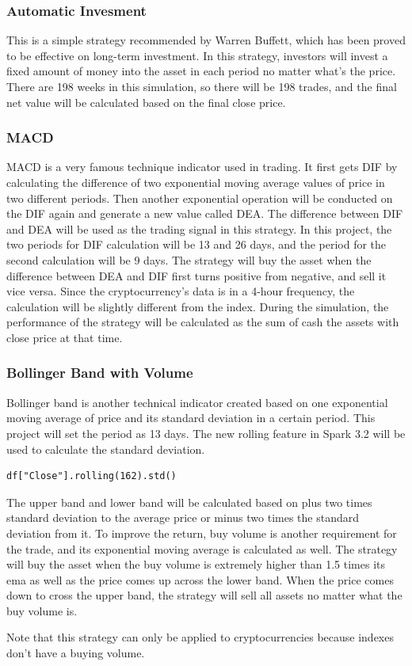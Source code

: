 \documentclass[a4paper]{article}
\begin{document}
\subsubsection{Automatic Invesment}
This is a simple strategy recommended by Warren Buffett, which has been proved to be effective on long-term investment. In this strategy, investors will invest a fixed amount of money into the asset in each period no matter what's the price. There are 198 weeks in this simulation, so there will be 198 trades, and the final net value will be calculated based on the final close price.
\subsubsection{MACD}
MACD is a very famous technique indicator used in trading. It first gets DIF by calculating the difference of two exponential moving average values of price in two different periods.  Then another exponential operation will be conducted on the DIF again and generate a new value called DEA. The difference between DIF and DEA will be used as the trading signal in this strategy. In this project, the two periods for DIF calculation will be 13 and 26 days, and the period for the second calculation will be 9 days. The strategy will buy the asset when the difference between DEA and DIF first turns positive from negative, and sell it vice versa. Since the cryptocurrency's data is in a 4-hour frequency, the calculation will be slightly different from the index. During the simulation, the performance of the strategy will be calculated as the sum of cash the assets with close price at that time.
\subsubsection{Bollinger Band with Volume}
Bollinger band is another technical indicator created based on one exponential moving average of price and its standard deviation in a certain period. This project will set the period as 13 days. The new rolling feature in Spark 3.2 will be used to calculate the standard deviation.
\begin{verbatim}
df["Close"].rolling(162).std()
\end{verbatim}
\par The upper band and lower band will be calculated based on plus two times standard deviation to the average price or minus two times the standard deviation from it. To improve the return, buy volume is another requirement for the trade, and its exponential moving average is calculated as well. The strategy will buy the asset when the buy volume is extremely higher than 1.5 times its ema as well as the price comes up across the lower band. When the price comes down to cross the upper band, the strategy will sell all assets no matter what the buy volume is.
\par Note that this strategy can only be applied to cryptocurrencies because indexes don't have a buying volume.
\end{document}
